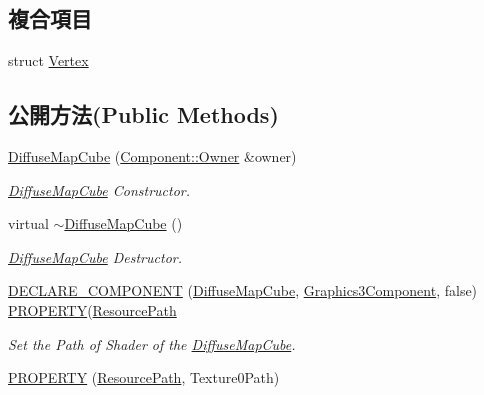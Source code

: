 \subsection*{複合項目}
\begin{DoxyCompactItemize}
\item 
struct \hyperlink{struct_magnum_1_1_diffuse_map_cube_1_1_vertex}{Vertex}
\end{DoxyCompactItemize}
\subsection*{公開方法(Public Methods)}
\begin{DoxyCompactItemize}
\item 
\hyperlink{class_magnum_1_1_diffuse_map_cube_a97484ad39262a4c9f0405a08a53c5d5a}{Diffuse\+Map\+Cube} (\hyperlink{class_magnum_1_1_component_1_1_owner}{Component\+::\+Owner} \&owner)
\begin{DoxyCompactList}\small\item\em \hyperlink{class_magnum_1_1_diffuse_map_cube}{Diffuse\+Map\+Cube} Constructor. \end{DoxyCompactList}\item 
virtual \hyperlink{class_magnum_1_1_diffuse_map_cube_af7de4ae795858e54bc969b29e48872ed}{$\sim$\+Diffuse\+Map\+Cube} ()
\begin{DoxyCompactList}\small\item\em \hyperlink{class_magnum_1_1_diffuse_map_cube}{Diffuse\+Map\+Cube} Destructor. \end{DoxyCompactList}\item 
\hyperlink{class_magnum_1_1_diffuse_map_cube_a012ed139924ce634f7329b8b07cb6d13}{D\+E\+C\+L\+A\+R\+E\+\_\+\+C\+O\+M\+P\+O\+N\+E\+NT} (\hyperlink{class_magnum_1_1_diffuse_map_cube}{Diffuse\+Map\+Cube}, \hyperlink{class_magnum_1_1_graphics3_component}{Graphics3\+Component}, false)       \hyperlink{class_magnum_1_1_diffuse_map_cube_a0637e9ef929de5a07c09cc122fad1295}{P\+R\+O\+P\+E\+R\+TY}(\hyperlink{class_magnum_1_1_resource_path}{Resource\+Path}
\begin{DoxyCompactList}\small\item\em Set the Path of Shader of the \hyperlink{class_magnum_1_1_diffuse_map_cube}{Diffuse\+Map\+Cube}. \end{DoxyCompactList}\item 
\hyperlink{class_magnum_1_1_diffuse_map_cube_a0637e9ef929de5a07c09cc122fad1295}{P\+R\+O\+P\+E\+R\+TY} (\hyperlink{class_magnum_1_1_resource_path}{Resource\+Path}, Texture0\+Path)

\end{DoxyCompactItemize}
